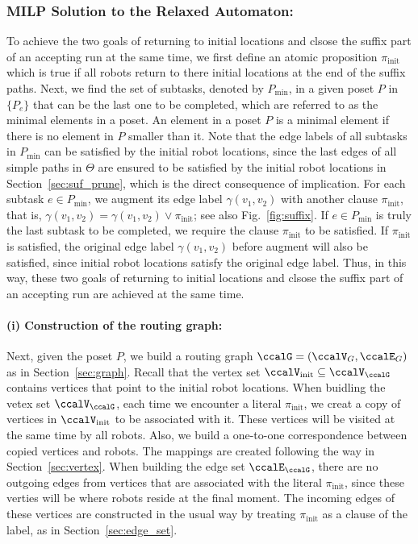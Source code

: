 \documentclass[Afour,sageh,times]{sagej}
\begin{document}
{{  \subsubsection{MILP Solution to the Relaxed Automaton:}\label{sec:suf_milp} To achieve the two goals of returning to initial locations and clsose the suffix part of an accepting run at the same time, we first define an atomic proposition $\pi_{\text{init}}$ which is true if all robots return to there initial locations at the end of the suffix paths. Next, we find the set of subtasks, denoted by $P_{\text{min}}$, in a given poset $P$ in $\{P_e\}$ that can be the last one to be completed, which are referred to as the minimal elements in a poset. An element in a poset $P$  is a minimal element if there is no element in $P$ smaller than it. Note that the edge labels of all subtasks in $P_{\text{min}}$ can be satisfied by the initial robot locations, since the last edges of all simple paths in $\Theta$ are ensured to be satisfied by the initial robot locations in Section~\ref{sec:suf_prune}, which is the direct consequence of implication.  For each subtask $e \in P_{\text{min}}$, we augment its edge label $\gamma(v_1, v_2)$ with another clause $\pi_{\text{init}}$, that is, $\gamma(v_1, v_2) = \gamma(v_1, v_2) \vee \pi_{\text{init}}$; see also Fig.~\ref{fig:suffix}. If $e \in P_{\text{min}}$ is truly the last subtask to be completed, we require the clause $ \pi_{\text{init}}$  to be satisfied. If $\pi_{\text{init}}$ is satisfied, the original edge label $\gamma(v_1, v_2)$ before augment will also be satisfied, since initial robot locations satisfy the original edge label. Thus, in this way, these two goals of returning to initial locations and clsose the suffix part of an accepting run are achieved  at the same time.
 \paragraph{(i) Construction of the routing graph:}   Next, given the poset $P$, we build a routing graph $\ccalG = (\ccalV_G, \ccalE_G)$ as in Section~\ref{sec:graph}. Recall that the vertex set $\ccalV_\text{init} \subseteq \ccalV_\ccalG$ contains vertices that point to the initial robot locations. When buidling the vetex set $\ccalV_\ccalG$, each time we encounter a literal $\pi_{\text{init}}$, we creat a copy of vertices in $\ccalV_{\text{init}}$ to be associated with it. These vertices will be visited at the same time by all robots.  Also, we build a one-to-one correspondence between copied vertices and robots. The mappings are created following the way in Section~\ref{sec:vertex}.  When  building the edge set $\ccalE_\ccalG$, there are no outgoing edges from  vertices that are associated with the literal $\pi_\text{init}$, since these verties will be where robots reside at the final moment. The incoming edges of these vertices are constructed in the usual way by treating $\pi_{\text{init}}$ as a clause of the label, as in Section~\ref{sec:edge_set}.
}}
\end{document}
